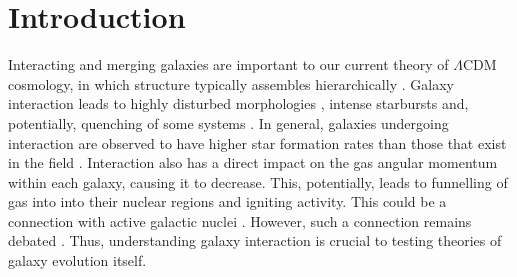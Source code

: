 

\section{Introduction}\label{intro}
\noindent Interacting and merging galaxies are important to our current theory of $\Lambda$CDM cosmology, in which structure typically assembles hierarchically \citep{2003ApJ...597...21A, 2005Natur.435..629S, 2007MNRAS.375....2D, 2008MNRAS.384....2G}. Galaxy interaction leads to highly disturbed morphologies \citep{1972ApJ...178..623T, 2005AJ....129..682H, 2016A&C....16...26W}, intense starbursts \citep{1996ApJ...464..641M, 2000MNRAS.312..859S, 2009PASJ...61..481S, 2021MNRAS.503.3113M} and, potentially, quenching of some systems \citep{2013MNRAS.430.1901H, 2018MNRAS.473.2679S, 2020MNRAS.493.3716H, 2023RAA....23i5026D}. In general, galaxies undergoing interaction are observed to have higher star formation rates than those that exist in the field \citep{2008AJ....135.1877E, 2012MNRAS.426..549S, 2019A&A...631A..51P}. Interaction also has a direct impact on the gas angular momentum within each galaxy, causing it to decrease. This, potentially, leads to funnelling of gas into into their nuclear regions and igniting activity. This could be a connection with active galactic nuclei \citep{2008AJ....135.1877E, li08, 2011MNRAS.418.2043E, 2015ApJ...806..219C}. However, such a connection remains debated \citep{2007MNRAS.375.1017A, 2010MNRAS.407.2399M, 2020ApJ...904...79M}. Thus, understanding galaxy interaction is crucial to testing theories of galaxy evolution itself.

